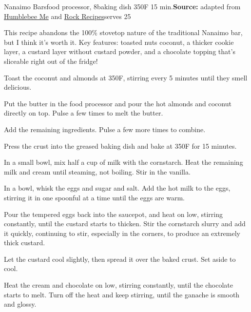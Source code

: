 \begin{recipe}[Nanaimo]{Nanaimo Bars}{food processor, 8\inch{}\inch baking dish \hfill 350\0F \hfill 15 min.}{\textbf{Source:} adapted from \href{https://www.humblebeeandme.com/totally-from-scratch-nanaimo-bars/}{Humblebee \And Me} and \href{https://www.rockrecipes.com/chocolate-mint-nanaimo-bars/}{Rock Recipes}\hfill serves 25}

 \freeform This recipe abandons the 100\% stovetop nature of the traditional Nanaimo bar, but I think it's worth it. Key features: toasted nuts \And coconut, a thicker cookie layer, a custard layer without custard powder, and a chocolate topping that's sliceable right out of the fridge!

 Toast the coconut and almonds at 350\0F, stirring every 5 minutes until they smell delicious.

 Put the butter in the food processor and pour the hot almonds and coconut directly on top. Pulse a few times to melt the butter.

 Add the remaining ingredients. Pulse a few more times to combine.

 \newstep Press the crust into the greased baking dish and bake at 350\0F for 15 minutes.

 In a small bowl, mix half a cup of milk with the cornstarch. Heat the remaining milk and cream until steaming, not boiling. Stir in the vanilla.

 In a bowl, whisk the eggs and sugar and salt. Add the hot milk to the eggs, stirring it in one spoonful at a time until the eggs are warm.

 \newstep Pour the tempered eggs back into the saucepot, and heat on low, stirring constantly, until the custard starts to thicken. Stir the cornstarch slurry and add it quickly, continuing to stir, especially in the corners, to produce an extremely thick custard.

 \newstep Let the custard cool slightly, then spread it over the baked crust. Set aside to cool.

 Heat the cream and chocolate on low, stirring constantly, until the chocolate starts to melt. Turn off the heat and keep stirring, until the ganache is smooth and glossy.


\end{recipe}
